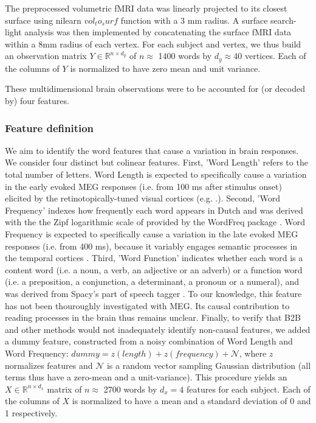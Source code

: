 The preprocessed volumetric fMRI data was linearly projected to its closest surface
using nilearn $vol_to_surf$ function with a 3 mm radius. A surface search-light
analysis was then implemented by concatenating the surface
fMRI data within a 8mm radius of each vertex. For each subject and vertex, we
thus build an observation matrix $Y \in \mathbb{R}^{n \times d_y}$ of $n\approx$ 1400 words
by $d_y\approx40$ vertices. Each
of the columns of $Y$ is normalized to have zero mean and unit variance.

These multidimensional brain observations were to be accounted for (or decoded by) four features.

\subsubsection{Feature definition}

We aim to identify the word features that cause a variation in brain responses. We consider four distinct but colinear features.
%
First, 'Word Length' refers to the total number of letters. Word Length is expected to specifically cause a variation in the early evoked MEG responses (i.e. from 100 ms after stimulus onset) elicited by the retinotopically-tuned visual cortices (e.g. \citep{pegado2014timing}.).
%
Second, 'Word Frequency' indexes how frequently each word appears in Dutch and was derived with the the Zipf logarithmic scale of \citep{van2014subtlex} provided by the WordFreq package \citep{speerwordfreq}. Word Frequency is expected to specifically cause a variation in the late evoked MEG responses (i.e. from 400 ms), because it variably engages semantic processes in the temporal cortices \citep{kutas2011thirty}.
%
Third, 'Word Function' indicates whether each word is a content word (i.e. a noun, a verb, an adjective or an adverb) or a function word (i.e. a preposition, a conjunction, a determinant, a pronoun or a numeral), and was derived from Spacy's part of speech tagger \citep{spacy2}. To our knowledge, this feature has not been thouroughly investigated with MEG. Its causal contribution to reading processes in the brain thus remains unclear.
%
Finally, to verify that B2B and other methods would not inadequately identify non-causal features, we added a dummy feature, constructed from a noisy combination of Word Length and Word Frequency:
$dummy = z(length) + z(frequency) + \mathcal{N}$, where $z$ normalizes features and $\mathcal{N}$ is a random vector sampling Gaussian distribution (all terms thus have a zero-mean and a unit-variance). This procedure yields an $X \in \mathbb{R}^{n \times d_x}$ matrix of $n\approx$ 2700 words by
$d_x=4$ features for each subject. Each of the columns of $X$ is normalized to
have a mean and a standard deviation of 0 and 1 respectively.

